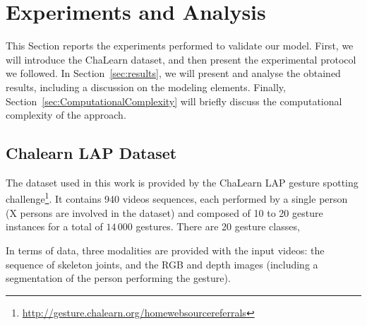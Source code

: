 

\section{Experiments and Analysis}

This Section reports the experiments performed to validate our model.
First, we will introduce the ChaLearn dataset, and then present the experimental protocol we followed.
In Section~\ref{sec:results}, we will present and analyse the obtained results, including a discussion 
on the modeling elements.
Finally, Section~\ref{sec:ComputationalComplexity} will briefly discuss the computational complexity of the approach.



\subsection{Chalearn LAP Dataset} 
\label{sec:chalearn}


The dataset used in this work is provided by the ChaLearn LAP \cite{chalearnLAP} gesture spotting challenge\footnote{\href{http://gesture.chalearn.org/homewebsourcereferrals}{http://gesture.chalearn.org/homewebsourcereferrals}}.
%
It contains 940 videos sequences, each performed by a single person (X persons are involved in the dataset) 
and composed of 10 to 20 gesture instances for a total of $14\,000$ gestures.
%
There are 20 gesture classes, 

In terms of data, three modalities are provided with the input videos: the sequence of skeleton joints, and the RGB and depth images 
(including a segmentation of the person performing the gesture). 




